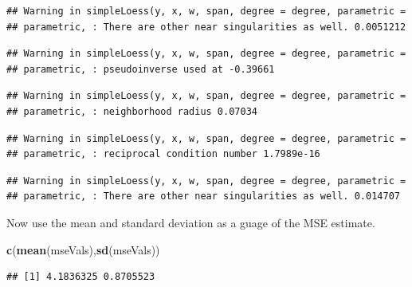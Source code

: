 \documentclass[]{article}
\newenvironment{Shaded}{\begin{snugshade}}{\end{snugshade}}
\newcommand{\KeywordTok}[1]{\textcolor[rgb]{0.13,0.29,0.53}{\textbf{#1}}}
\newcommand{\NormalTok}[1]{#1}
\begin{document}
\begin{verbatim}
## Warning in simpleLoess(y, x, w, span, degree = degree, parametric =
## parametric, : There are other near singularities as well. 0.0051212
\end{verbatim}

\begin{verbatim}
## Warning in simpleLoess(y, x, w, span, degree = degree, parametric =
## parametric, : pseudoinverse used at -0.39661
\end{verbatim}

\begin{verbatim}
## Warning in simpleLoess(y, x, w, span, degree = degree, parametric =
## parametric, : neighborhood radius 0.07034
\end{verbatim}

\begin{verbatim}
## Warning in simpleLoess(y, x, w, span, degree = degree, parametric =
## parametric, : reciprocal condition number 1.7989e-16
\end{verbatim}

\begin{verbatim}
## Warning in simpleLoess(y, x, w, span, degree = degree, parametric =
## parametric, : There are other near singularities as well. 0.014707
\end{verbatim}

Now use the mean and standard deviation as a guage of the MSE estimate.

\begin{Shaded}
\begin{Highlighting}[]
\KeywordTok{c}\NormalTok{(}\KeywordTok{mean}\NormalTok{(mseVals),}\KeywordTok{sd}\NormalTok{(mseVals))}
\end{Highlighting}
\end{Shaded}

\begin{verbatim}
## [1] 4.1836325 0.8705523
\end{verbatim}
\end{document}
